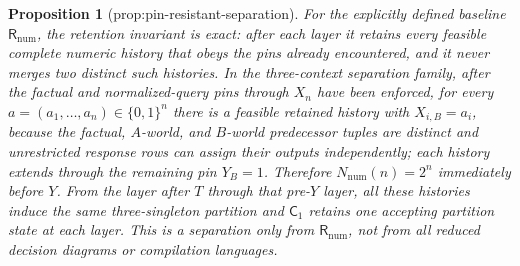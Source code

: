 \documentclass{article}
\newtheorem{proposition}{Proposition}
\begin{document}
\begin{proposition}[prop:pin-resistant-separation]\label{prop:pin-resistant-separation}
For the explicitly defined baseline \(\mathsf R_{\mathrm{num}}\), the retention invariant is exact: after each layer it retains every feasible complete numeric history that obeys the pins already encountered, and it never merges two distinct such histories. In the three-context separation family, after the factual and normalized-query pins through \(X_n\) have been enforced, for every \(a=(a_1,\ldots,a_n)\in\{0,1\}^n\) there is a feasible retained history with \(X_{i,B}=a_i\), because the factual, \(A\)-world, and \(B\)-world predecessor tuples are distinct and unrestricted response rows can assign their outputs independently; each history extends through the remaining pin \(Y_B=1\). Therefore \(N_{\mathrm{num}}(n)=2^n\) immediately before \(Y\). From the layer after \(T\) through that pre-\(Y\) layer, all these histories induce the same three-singleton partition and \(\mathsf C_1\) retains one accepting partition state at each layer. This is a separation only from \(\mathsf R_{\mathrm{num}}\), not from all reduced decision diagrams or compilation languages.
\end{proposition}
\end{document}
